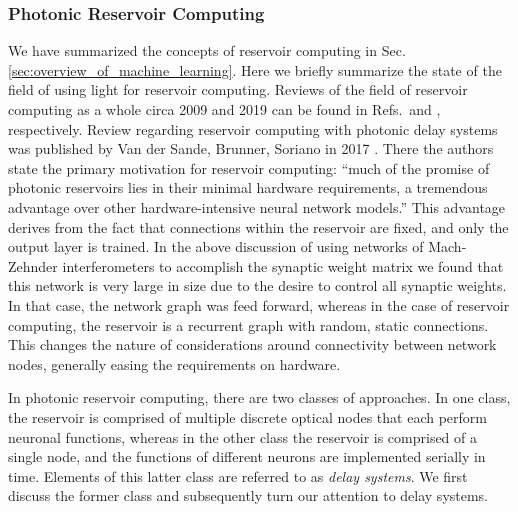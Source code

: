 \subsubsection{Photonic Reservoir Computing}
We have summarized the concepts of reservoir computing in Sec.\,\ref{sec:overview_of_machine_learning}. Here we briefly summarize the state of the field of using light for reservoir computing. Reviews of the field of reservoir computing as a whole circa 2009 and 2019 can be found in Refs.\, and , respectively. Review regarding reservoir computing with photonic delay systems was published by Van der Sande, Brunner, Soriano in 2017 \cite{vabr2017}. There the authors state the primary motivation for reservoir computing: ``much of the promise of photonic reservoirs lies in their minimal hardware requirements, a tremendous advantage over other hardware-intensive neural network models.'' This advantage derives from the fact that connections within the reservoir are fixed, and only the output layer is trained. In the above discussion of using networks of Mach-Zehnder interferometers to accomplish the synaptic weight matrix we found that this network is very large in size due to the desire to control all synaptic weights. In that case, the network graph was feed forward, whereas in the case of reservoir computing, the reservoir is a recurrent graph with random, static connections. This changes the nature of considerations around connectivity between network nodes, generally easing the requirements on hardware. 

In photonic reservoir computing, there are two classes of approaches. In one class, the reservoir is comprised of multiple discrete optical nodes that each perform neuronal functions, whereas in the other class the reservoir is comprised of a single node, and the functions of different neurons are implemented serially in time. Elements of this latter class are referred to as \textit{delay systems}. We first discuss the former class and subsequently turn our attention to delay systems.

